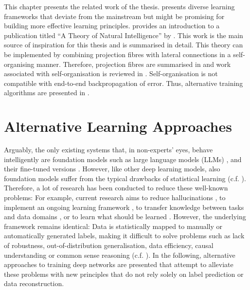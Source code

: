 This chapter presents the related work of the thesis.  presents diverse learning frameworks that deviate from the mainstream but might be promising for building more effective learning principles.  provides an introduction to a publication titled ``A Theory of Natural Intelligence'' by . This work is the main source of inspiration for this thesis and is summarised in detail.
This theory can be implemented by combining projection fibres with lateral connections in a self-organising manner. Therefore, projection fibres are summarised in  and work associated with self-organisation is reviewed in . Self-organisation is not compatible with end-to-end backpropagation of error. Thus, alternative training algorithms are presented in . %


\section{Alternative Learning Approaches}
Arguably, the only existing systems that, in non-experts' eyes, behave intelligently are foundation models such as large language models (LLMs) , and their fine-tuned versions . However, like other deep learning models, also foundation models suffer from the typical drawbacks of statistical learning (c.f. ). Therefore, a lot of research has been conducted to reduce these well-known problems: For example, current research aims to reduce hallucinations , to implement an ongoing learning framework \cite{sahoo_online_2018, hoi_online_2021}, to transfer knowledge between tasks and data domains \cite{zhuang_comprehensive_2021, sager_unsupervised_2022}, or to learn what should be learned \cite{thrun_introduction_1998, hospedales_meta-learning_2022}. However, the underlying framework remains identical: Data is statistically mapped to manually or automatically generated labels, making it difficult to solve problems such as lack of robustness,  out-of-distribution generalisation, data efficiency, causal understanding or common sense reasoning (c.f. ). In the following, alternative approaches to training deep networks are presented that attempt to alleviate these problems with new principles that do not rely solely on label prediction or data reconstruction. 

